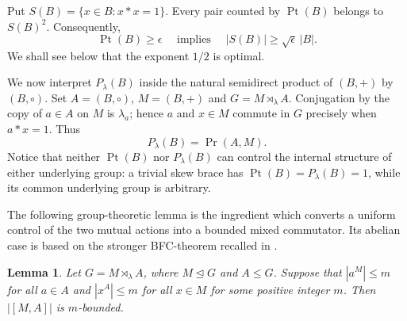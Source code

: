 \documentclass[11pt, oneside]{amsart}
\numberwithin{equation}{section}
\theoremstyle{plain}
\newtheorem{lem}[equation]{Lemma}
\theoremstyle{definition}
\newcommand{\Pt}{\operatorname{Pt} }
\renewcommand{\Pr}{\operatorname{Pr} }
\begin{document}
Put $S(B)=\{x\in B:x*x= 1\}$. Every pair counted by $\Pt(B)$ belongs to
$S(B)^2$. Consequently,
$$
\Pt(B)\geqslant\epsilon
\quad \mbox{ implies }\quad
|S(B)|\geqslant\sqrt{\epsilon}\,|B|.
$$
We shall see below that the exponent $1/2$ is optimal.

We now interpret $P_\lambda(B)$ inside the natural semidirect product of $(B,+)$ by $(B,\circ)$. Set
$A=(B,\circ)$, $M=(B,+)$ and $G=M\rtimes_\lambda A$. Conjugation by the
copy of $a\in A$ on $M$ is $\lambda_a$; hence $a$ and $x\in M$ commute
in $G$ precisely when $a*x=1$. Thus
$$
P_\lambda(B)= \Pr(A,M).
$$
Notice that neither $\Pt(B)$ nor $P_\lambda(B)$ can control the internal
structure of either underlying group: a trivial skew brace has
$\Pt(B)=P_\lambda(B)=1$, while its common underlying group is arbitrary.

The following group-theoretic lemma is the ingredient which converts a
uniform control of the two mutual actions into a bounded mixed
commutator. Its abelian case is based on the stronger BFC-theorem
recalled in \cite[Lemma 2.2, Theorem 2.4]{DS22}.


\begin{lem}\label{lem:mixed-BFC}
Let $G=M \rtimes_\lambda A$, where $M\unlhd G$ and $A\leqslant G$. Suppose that
$|a^M|\leqslant m$ for all $a\in A$ and $|x^A|\leqslant m$ for all $x\in M$ for some positive integer $m$. Then $|[M,A]|$ is $m$-bounded.
\end{lem}
\end{document}
